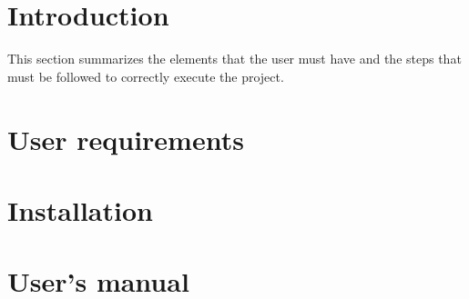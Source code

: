 
\section{Introduction}
\nonzeroparskip This section summarizes the elements that the user must have and the steps that must be followed to correctly execute the project.

\section{User requirements}
\nonzeroparskip 

\section{Installation}
\nonzeroparskip 

\section{User's manual}
\nonzeroparskip 
